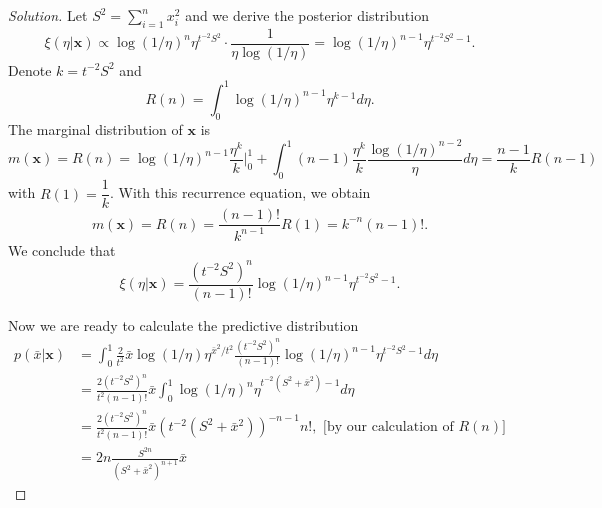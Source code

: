 \begin{proof}[Solution]
    Let $S^2 = \sum_{i=1}^n x_i^2$ and we derive the posterior distribution 
    $$
    \xi(\eta|\boldsymbol{x}) \propto \log(1/\eta)^n \eta^{t^{-2}S^2}\cdot\frac{1}{\eta\log(1/\eta)} = \log(1/\eta)^{n-1} \eta^{t^{-2}S^2 - 1}.
    $$
    Denote $k = t^{-2}S^2$ and
    $$
    R(n) = \int_0^1 \log(1/\eta)^{n-1} \eta^{k - 1} d\eta.
    $$
    The marginal distribution of $\boldsymbol{x}$ is 
    $$
    m(\boldsymbol{x}) = R(n) = \log(1/\eta)^{n-1}\frac{\eta^k}{k}\bigg|_0^1 + \int_0^1 (n-1)\frac{\eta^k}{k}\frac{\log(1/\eta)^{n-2}}{\eta} d\eta = \frac{n-1}{k}R(n-1)
    $$
    with $R(1) = \dfrac{1}{k}$. With this recurrence equation, we obtain 
    $$
    m(\boldsymbol{x}) = R(n) = \frac{(n-1)!}{k^{n-1}}R(1) = k^{-n}(n-1)!.
    $$
    We conclude that 
    $$
    \xi(\eta|\boldsymbol{x}) = \frac{(t^{-2}S^2)^n}{(n-1)!}\log(1/\eta)^{n-1}\eta^{t^{-2}S^2 - 1}.
    $$

    Now we are ready to calculate the predictive distribution 
    \begin{equation*}
        \begin{split}
            p(\bar{x}|\boldsymbol{x}) & = \int_0^1 \frac{2}{t^2}\bar{x}\log(1/\eta)\eta^{\bar{x}^2/t^2}\frac{(t^{-2}S^2)^n}{(n-1)!}\log(1/\eta)^{n-1}\eta^{t^{-2}S^2 - 1} d\eta \\
            &= \frac{2(t^{-2}S^2)^n}{t^2(n-1)!} \bar{x} \int_0^1 \log(1/\eta)^n\eta^{t^{-2}(S^2+\bar{x}^2) - 1} d\eta \\
            &= \frac{2(t^{-2}S^2)^n}{t^2(n-1)!} \bar{x}(t^{-2}(S^2 + \bar{x}^2))^{-n-1}n!,  \text{ [by our calculation of }R(n)]\\
            &= 2n\frac{S^{2n}}{(S^2 + \bar{x}^2)^{n+1}}\bar{x}
        \end{split}
    \end{equation*}
\end{proof}